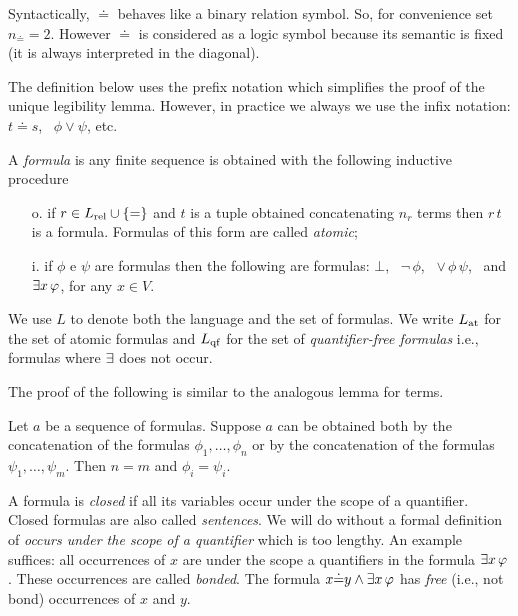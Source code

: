 


Syntactically, $\doteq$ behaves like a binary relation symbol. So, for convenience set $n_{\scriptscriptstyle\doteq}=2$. However $\doteq$ is considered as a logic symbol because its semantic is fixed (it is always interpreted in the diagonal).

The definition below uses the prefix notation which simplifies the proof of the unique legibility lemma. However, in practice we always we use the infix notation: $t\doteq s$, \ $\phi\vee\psi$, etc.


\begin{definition}\label{defformule} 
A \emph{formula\/} is any finite sequence is obtained with the following inductive procedure

\begin{itemize}
\item[o.] if $r\in L_{\rm rel}\cup \{=\}$ and $t$ is a tuple obtained concatenating $n_r$ terms then $r\,t$ is a formula. Formulas of this form are called \emph{atomic};

\item[i.] if $\phi$ e $\psi$ are formulas then the following are formulas: $\bot$, \ ${\neg}\,\phi$, \ ${\vee}\,\phi\,\psi$, \ and $\exists x\,\varphi$, for any $x\in V$.\QED
\end{itemize}
\end{definition}


We use \emph{$L$\/} to denote both the language and the set of formulas. We write \emph{$L_{\rm at}$\/} for the set of atomic formulas and \emph{$L_{\rm qf}$\/} for the set of \emph{quantifier-free formulas\/} i.e., formulas where $\exists$ does not occur.

The proof of the following is similar to the analogous lemma for terms.

\begin{lemma}
\label{lemmaformuleleggibilita}
Let $a$ be a sequence of formulas. Suppose $a$ can be obtained both by the concatenation of the formulas $\phi_1,\dots,\phi_n$ or by the concatenation of the formulas $\psi_1,\dots,\psi_m$. Then $n=m$ and $\phi_i=\psi_i$.\QED
\end{lemma}


A formula is \emph{closed\/} if all its variables occur under the scope of a quantifier. Closed formulas are also called \emph{sentences}. We will do without a formal definition of \textit{occurs under the scope of a quantifier\/} which is too lengthy. An example suffices: all occurrences of $x$ are under the scope a quantifiers in the formula $\exists x\,\varphi$. These occurrences are called \emph{bonded}. The formula $x{\doteq}y\wedge\exists x\,\varphi$ has \emph{free\/} (i.e., not bond) occurrences of $x$ and $y$.

